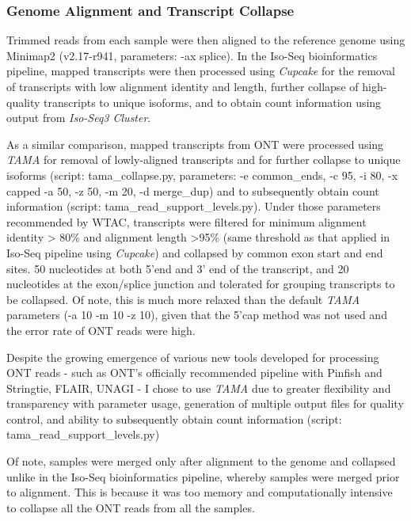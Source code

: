 \subsubsection{Genome Alignment and Transcript Collapse}
Trimmed reads from each sample were then aligned to the reference genome using Minimap2 \cite{Li2018} (v2.17-r941, parameters: -ax splice). In the Iso-Seq bioinformatics pipeline, mapped transcripts were then processed using \textit{Cupcake} for the removal of transcripts with low alignment identity and length, further collapse of high-quality transcripts to unique isoforms, and to obtain count information using output from \textit{Iso-Seq3 Cluster}.

As a similar comparison, mapped transcripts from ONT were processed using \textit{TAMA} for removal of lowly-aligned transcripts and for further collapse to unique isoforms (script: tama\_collapse.py, parameters: -e common\_ends, -c 95, -i 80, -x capped -a 50, -z 50, -m 20, -d merge\_dup) and to subsequently obtain count information (script: tama\_read\_support\_levels.py). Under those parameters recommended by WTAC, transcripts were filtered for minimum alignment identity > 80\% and alignment length >95\% (same threshold as that applied in Iso-Seq pipeline using \textit{Cupcake}) and collapsed by common exon start and end sites. 50 nucleotides at both 5'end and 3' end of the transcript, and 20 nucleotides at the exon/splice junction and tolerated for grouping transcripts to be collapsed. Of note, this is much more relaxed than the default \textit{TAMA} parameters (-a 10 -m 10 -z 10), given that the 5'cap method was not used and the error rate of ONT reads were high. 

Despite the growing emergence of various new tools developed for processing ONT reads - such as ONT's officially recommended pipeline with Pinfish and Stringtie, FLAIR, UNAGI - I chose to use \textit{TAMA} due to greater flexibility and transparency with parameter usage, generation of multiple output files for quality control, and ability to subsequently obtain count information (script: tama\_read\_support\_levels.py)

Of note, samples were merged only after alignment to the genome and collapsed unlike in the Iso-Seq bioinformatics pipeline, whereby samples were merged prior to alignment. This is because it was too memory and computationally intensive to collapse all the ONT reads from all the samples. 